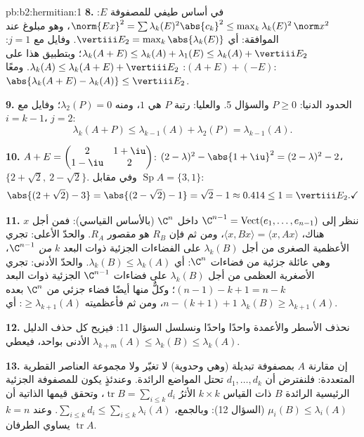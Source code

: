 \begin{solution}{pb:b2:hermitian:1}
\textbf{8.} في أساس طيفي للمصفوفة $E$: $\norm{Ex}^2 = \sum
\lambda_k(E)^2\abs{c_k}^2 \leq \max_k\lambda_k(E)^2\,\norm
x^2$، وهو مبلوغ عند  الموافقة: أي $\vertiii E_2
= \max_k\abs{\lambda_k(E)}$. وفايل مع $j = 1$: $\lambda_k(A+E)
\leq \lambda_k(A) + \lambda_1(E) \leq \lambda_k(A) + \vertiii
E_2$؛ وبتطبيق هذا على $(A+E) + (-E)$: $\lambda_k(A) \leq
\lambda_k(A+E) + \vertiii E_2$. ومعًا:
$\abs{\lambda_k(A+E) - \lambda_k(A)} \leq \vertiii E_2$.

\textbf{9.} الحدود الدنيا: $P \geq 0$ والسؤال 5. والعليا: رتبة $P$
هي $1$، ومنه $\lambda_2(P) = 0$؛ وفايل مع $i = k-1$، $j =
2$:
\[
\lambda_k(A + P) \leq \lambda_{k-1}(A) + \lambda_2(P)
= \lambda_{k-1}(A) .
\]

\textbf{10.} $A + E = \begin{pmatrix} 2 & 1+\iu\\ 1-\iu &
2\end{pmatrix}$:  $(2-\lambda)^2 -
\abs{1+\iu}^2 = (2-\lambda)^2 - 2$،  $\{2 + \sqrt2,\ 2
- \sqrt2\}$. وفي مقابل $\operatorname{Sp}A = \{3, 1\}$:
\[
\abs{(2+\sqrt2) - 3} = \abs{(2-\sqrt2) - 1} = \sqrt2 - 1
\approx 0.414 \leq 1 = \vertiii E_2 . \checkmark
\]

\textbf{11.} ننظر إلى $\C^{n-1} = \operatorname{Vect}(e_1, \dots,
e_{n-1})$ داخل $\C^n$ (بالأساس القياسي): فمن أجل $x$ هناك،
$\langle x, Bx\rangle = \langle x, Ax\rangle$، ومن ثم فإن $R_B$ هو
مقصور $R_A$. والحدّ الأعلى: تجري الأعظمية الصغرى من أجل $\lambda_k
(B)$ على الفضاءات الجزئية ذوات البعد $k$ \emph{من}
$\C^{n-1}$، وهي عائلة جزئية من فضاءات $\C^n$: أي $\lambda_k(B) \leq
\lambda_k(A)$. والحدّ الأدنى: تجري الأصغرية العظمى من أجل $\lambda_k(B)$
على فضاءات $\C^{n-1}$ الجزئية ذوات البعد $(n-1)-k+1 =
n-k$؛ وكلٌّ منها أيضًا فضاء جزئي من $\C^n$ بعده $n -
(k+1) + 1$، ومن ثم فأعظميته $\geq \lambda_{k+1}(A)$:
أي $\lambda_k(B) \geq \lambda_{k+1}(A)$.

\textbf{12.} نحذف الأسطر والأعمدة واحدًا واحدًا ونسلسل
السؤال 11: فيزيح كل حذف الدليل الأدنى بواحد، فيعطي
$\lambda_{k+m}(A) \leq \lambda_k(B) \leq \lambda_k(A)$.

\textbf{13.} إن مقارنة $A$ بمصفوفة تبديلة (وهي وحدوية)
لا تغيّر  ولا مجموعة العناصر القطرية
المتعددة: فلنفترض أن $d_1, \dots, d_k$ تحتل المواضع الرائدة.
وعندئذٍ يكون للمصفوفة الجزئية الرئيسية الرائدة $B$ ذات القياس $k\times k$
الأثرُ $\operatorname{tr} B = \sum_{i\leq k}d_i$، وتحقق قيمها الذاتية
أن $\mu_i(B) \leq \lambda_i(A)$ (السؤال 12): وبالجمع،
$\sum_{i\leq k}d_i \leq \sum_{i\leq k}\lambda_i(A)$. وعند $k =
n$ يساوي الطرفان $\operatorname{tr} A$.


\end{solution}
